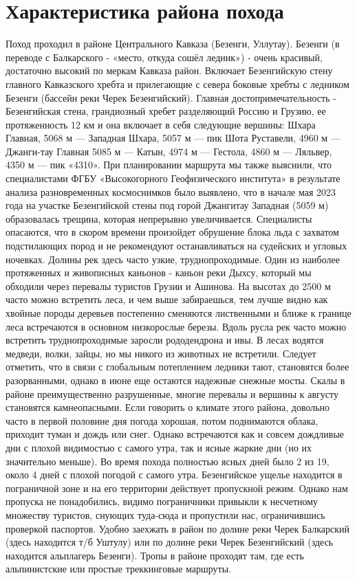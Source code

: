 \section{Характеристика района похода}\label{sec:characteristics_of_area}
    Поход проходил в районе Центрального Кавказа (Безенги, Уллутау).
    Безенги (в переводе с Балкарского - «место, откуда сошёл ледник») - очень красивый, достаточно высокий по меркам Кавказа район. Включает Безенгийскую стену главного Кавказского хребта и прилегающие с севера боковые хребты с ледником Безенги (бассейн реки Черек Безенгийский). Главная достопримечательность - Безенгийская стена, грандиозный хребет разделяющий Россию и Грузию, ее протяженность 12 км и она включает в себя следующие вершины: Шхара Главная, 5068 м — Западная Шхара, 5057 м — пик Шота Руставели, 4960 м — Джанги-тау Главная 5085 м — Катын, 4974 м — Гестола, 4860 м — Ляльвер, 4350 м — пик «4310». При планировании маршрута мы также выяснили, что специалистами ФГБУ «Высокогорного Геофизического института» в результате анализа разновременных космоснимков было выявлено, что в начале мая 2023 года на участке Безенгийской стены под горой Джангитау Западная (5059 м) образовалась трещина, которая непрерывно увеличивается. Специалисты опасаются, что в скором времени произойдет обрушение блока льда с захватом подстилающих пород и не рекомендуют останавливаться на судейских и угловых ночевках.
    Долины рек здесь часто узкие, труднопроходимые. Один из наиболее протяженных и живописных каньонов - каньон реки Дыхсу, который мы обходили через перевалы туристов Грузии и Ашинова. На высотах до 2500 м часто можно встретить леса, и чем выше забираешься, тем лучше видно как хвойные породы деревьев постепенно сменяются лиственными и ближе к границе леса встречаются в основном низкорослые березы. Вдоль русла рек часто можно встретить труднопроходимые заросли рододендрона и ивы. В лесах водятся медведи, волки, зайцы, но мы никого из животных не встретили. Следует отметить, что в связи с глобальным потеплением ледники тают, становятся более разорванными, однако в июне еще остаются надежные снежные мосты. Скалы в районе преимущественно разрушенные, многие перевалы и вершины к августу становятся камнеопасными. 
    Если говорить о климате этого района, довольно часто в первой половине дня погода хорошая, потом поднимаются облака, приходит туман и дождь или снег. Однако встречаются как и совсем дождливые дни с плохой видимостью с самого утра, так и ясные жаркие дни (но их значительно меньше). Во время похода полностью ясных дней было 2 из 19, около 4 дней с плохой погодой с самого утра.
    Безенгийское ущелье находится в пограничной зоне и на его территории действует пропускной режим. Однако нам пропуска не понадобились, видимо пограничники привыкли к несчетному множеству туристов, снующих туда-сюда и пропустили нас, ограничившись проверкой паспортов. Удобно заехжать в район по долине реки Черек Балкарский (здесь находится т/б Уштулу) или по долине реки Черек Безенгийский (здесь находится альплагерь Безенги). Тропы в районе проходят там, где есть альпинистские или простые треккинговые маршруты.


